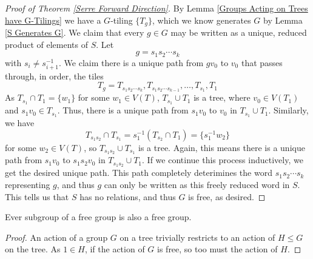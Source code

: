 \begin{proof}[Proof of Theorem \ref{Serre Forward Direction}]
    By Lemma \ref{Groups Acting on Trees have G-Tilings} we have a $G$-tiling $\{T_g\}$, which we know generates $G$ by Lemma \ref{S Generates G}. We claim that every $g \in G$ may be written as a unique, reduced product of elements of $S$. Let 
    \[g = s_1s_2 \cdots s_k\]
    with $s_i \neq s_{i+1}^{-1}$. We claim there is a unique path from $gv_0$ to $v_0$ that passes through, in order, the tiles
    \[T_g = T_{s_1s_2\cdots s_k}, T_{s_1s_2\cdots s_{k-1}}, \ldots, T_{s_1}, T_1\]
    As $T_{s_1} \cap T_1 = \{w_1\}$ for some $w_1 \in V(T)$, $T_{s_1} \cup T_1$ is a tree, where $v_0 \in V(T_1)$ and $s_1v_0 \in T_{s_1}$. Thus, there is a unique path from $s_1v_0$ to $v_0$ in $T_{s_1} \cup T_1$. Similarly, we have 
    \[T_{s_1s_2} \cap T_{s_1} = s_1^{-1}(T_{s_2} \cap T_1) = \{s_1^{-1}w_2\}\]
    for some $w_2 \in V(T)$, so $T_{s_1s_2} \cup T_{s_1}$ is a tree. Again, this means there is a unique path from $s_1v_0$ to $s_1s_2v_0$ in $T_{s_1s_2} \cup T_1$. If we continue this process inductively, we get the desired unique path. This path completely deterimines the word $s_1s_2\cdots s_k$ representing $g$, and thus $g$ can only be written as this freely reduced word in $S$. This tells us that $S$ has no relations, and thus $G$ is free, as desired. 
\end{proof}

\begin{cor}
    Ever subgroup of a free group is also a free group. 
\end{cor}

\begin{proof}
    An action of a group $G$ on a tree trivially restricts to an action of $H \leq G$ on the tree. As $1 \in H$, if the action of $G$ is free, so too must the action of $H$. 
\end{proof}
